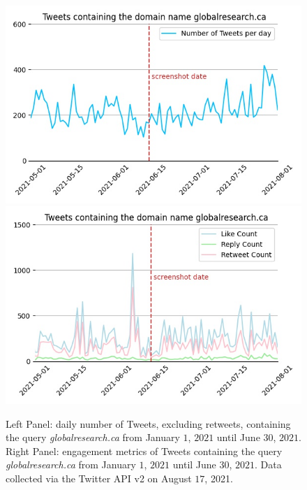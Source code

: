 \documentclass{article}
\begin{document}
\begin{figure}[h]
\centering
\hspace{-2em}
		\includegraphics[scale=0.4]{../figure/globalresearch_domain_2021-08-17.jpg} 
		\includegraphics[scale=0.4]{../figure/globalresearch_domain_engagement_2021-08-17.jpg}
\caption{Left Panel: daily number of Tweets, excluding retweets, containing the query {\it globalresearch.ca} from January $1$, $2021$ until June $30$, $2021$. Right Panel: engagement metrics of Tweets containing the query {\it globalresearch.ca} from January $1$, $2021$ until June $30$, $2021$. Data collected via the Twitter API v2 on August $17$, 2021.   }
\label{fig4}
\end{figure}
\end{document}
